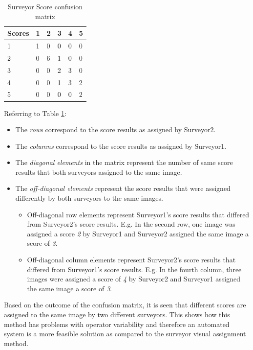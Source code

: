 \documentclass[conference]{IEEEtran}
\begin{document}
{{\begin{table}[t!]
\renewcommand{\arraystretch}{1.3}
\caption{Surveyor Score confusion matrix }
\centering
    \begin{tabular}{|l|
    lllll|}
    \hline
     Scores&1 & 2  & 3 & 4 & 5  \\    \hline
     1& 1 & 0  & 0 & 0 & 0  \\
     2& 0 & 6  & 1 & 0 & 0  \\
     3& 0 & 0  & 2 & 3  & 0    \\
     4& 0 & 0  & 1 & 3  & 2 \\
     5& 0 & 0  & 0 & 0  & 2 \\ \hline
    \end{tabular}

    \label{tbl:CM}
\end{table}}


Referring to Table \ref{tbl:CM}:
\begin{itemize}
  \item The \emph{rows} correspond to the score results as assigned by Surveyor2.
  \item The \emph{columns} correspond to the score results as assigned by Surveyor1.
  \item The \emph{diagonal elements} in the matrix represent the number of same score results that both surveyors assigned to the same image.
  \item The \emph{off-diagonal elements} represent the score results that were assigned differently by both surveyors to the same images.
      \begin{itemize}
        \item Off-diagonal row elements represent Surveyor1's score results that differed from Surveyor2's score results. E.g. In the second row, one image was assigned a score \emph{2} by Surveyor1 and Surveyor2 assigned the same image a score of \emph{3}.
        \item Off-diagonal column elements represent Surveyor2's score results that differed from Surveyor1's score results. E.g. In the fourth column, three images were assigned a score of \emph{4} by Surveyor2 and Surveyor1 assigned the same image a score of \emph{3}.
      \end{itemize}
\end{itemize}


 Based on the outcome of the confusion matrix, it is seen that different scores are assigned to the same image by two different surveyors. This shows how this method has problems with operator variability and therefore an automated system is a more feasible solution as compared to the surveyor visual assignment method.

}
\end{document}

